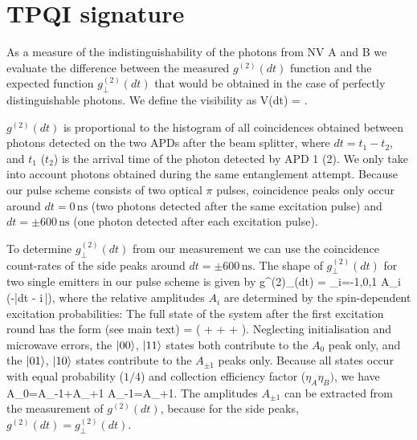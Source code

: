 \section{TPQI signature}

As a measure of the indistinguishability of the photons from NV A and B we evaluate the difference between the measured $g^{(2)}(dt)$ function and the expected function $g^{(2)}_\perp(dt)$ that would be obtained in the case of perfectly distinguishable photons. We define the visibility as
\be
	\label{eqn:tpqi_visibility}
	V(dt) = .
\ee

$g^{(2)}(dt)$ is proportional to the histogram of all coincidences obtained between photons detected on the two APDs after the beam splitter, where $dt = t_1 - t_2$, and $t_1$ ($t_2$) is the arrival time of the photon detected by APD 1 (2). We only take into account photons obtained during the same entanglement attempt. Because our pulse scheme consists of two optical $\pi$ pulses, coincidence peaks only occur around $dt = 0\,\text{ns}$ (two photons detected after the same excitation pulse) and $dt = \pm 600\,\text{ns}$ (one photon detected after each excitation pulse). 

To determine $g^{(2)}_\perp(dt)$ from our measurement we can use the coincidence count-rates of the side peaks around $dt = \pm 600\,\text{ns}$. The shape of $g^{(2)}_\perp(dt)$ for two single emitters in our pulse scheme is given by
\be
g^{(2)}_\perp(dt) = \sum_{i=-1,0,1} A_i \exp (-\Gamma |dt - i\,|),
\ee
where the relative amplitudes $A_i$ are determined by the spin-dependent excitation probabilities: The full state of the system after the first excitation round has the form (see main text)
\be
	\ket{\psi} =  \left ( \ket{\uparrow\uparrow} +  \ket{\downarrow\downarrow} + \ket{\uparrow\downarrow} + \ket{\downarrow\uparrow} \right ).
\ee
Neglecting initialisation and microwave errors, the $\left|00\right>$, $\left|11\right>$ states both contribute to the $A_0$ peak only, and the $\left|01\right>$, $\left|10\right>$ states contribute to the $A_{\pm 1}$ peaks only. Because all states occur with equal probability ($1/4$) and collection efficiency factor ($\eta_A\eta_B)$, we have 
\be
A_0=A_{-1}+A_{+1} A_{-1}=A_{+1}.
\ee
The amplitudes $A_{\pm 1}$ can be extracted from the measurement of $g^{(2)}(dt)$, because for the side peaks, $g^{(2)}(dt) = g^{(2)}_\perp(dt)$. %

